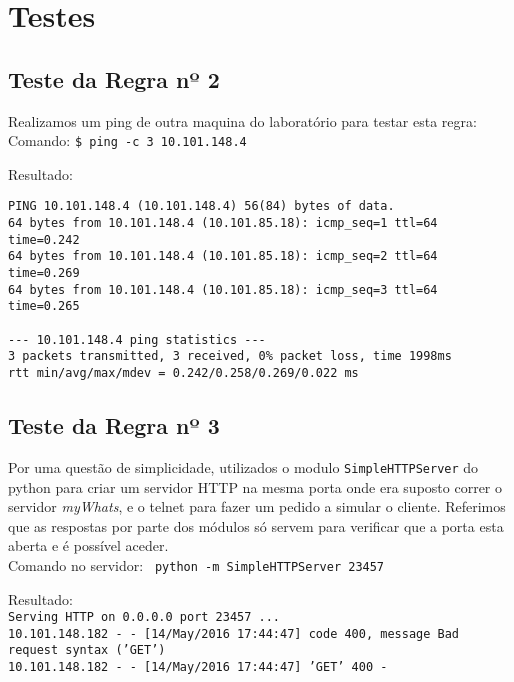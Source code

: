 \documentclass[12pt, a4paper, twoside]{report} %
\begin{document}
\clearpage

\section{Testes}

\subsection{Teste da Regra nº 2}

\noindent Realizamos um ping de outra maquina do laboratório para testar esta regra: \\

\noindent Comando: \texttt{\$ ping -c 3 10.101.148.4}

\noindent Resultado:

\begin{lstlisting}
PING 10.101.148.4 (10.101.148.4) 56(84) bytes of data.
64 bytes from 10.101.148.4 (10.101.85.18): icmp_seq=1 ttl=64 time=0.242
64 bytes from 10.101.148.4 (10.101.85.18): icmp_seq=2 ttl=64 time=0.269
64 bytes from 10.101.148.4 (10.101.85.18): icmp_seq=3 ttl=64 time=0.265

--- 10.101.148.4 ping statistics ---
3 packets transmitted, 3 received, 0% packet loss, time 1998ms
rtt min/avg/max/mdev = 0.242/0.258/0.269/0.022 ms
\end{lstlisting}

\clearpage

\subsection{Teste da Regra nº 3}

\noindent Por uma questão de simplicidade, utilizados o modulo \texttt{SimpleHTTPServer} do python para criar um servidor HTTP na mesma porta onde era suposto correr o servidor \textit{myWhats}, e o telnet para fazer um pedido a simular o cliente. Referimos que as respostas por parte dos módulos só servem para verificar que a porta esta aberta e é possível aceder. \\

\noindent Comando no servidor: \texttt{ python -m SimpleHTTPServer 23457}

\noindent Resultado: \\

\noindent \texttt{Serving HTTP on 0.0.0.0 port 23457 ...} \\
\noindent \texttt{10.101.148.182 - - [14/May/2016 17:44:47] code 400, message Bad request syntax ('GET')} \\
\texttt{10.101.148.182 - - [14/May/2016 17:44:47] 'GET' 400 -} \\
\end{document}

